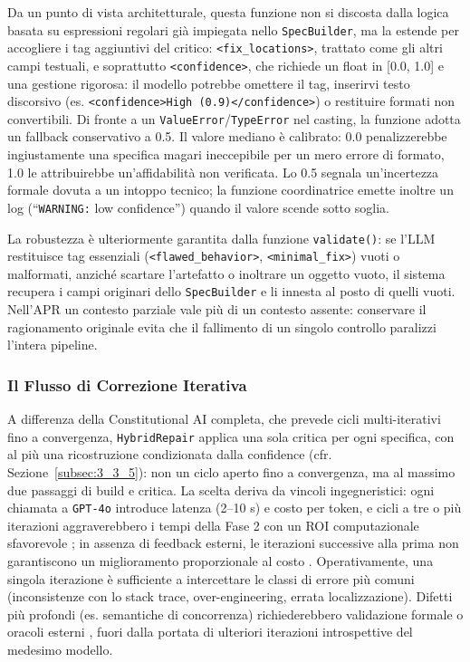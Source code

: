Da un punto di vista architetturale, questa funzione non si discosta dalla logica
basata su espressioni regolari già impiegata nello \texttt{SpecBuilder}, ma la
estende per accogliere i tag aggiuntivi del critico: \texttt{<fix\_locations>}, trattato come gli altri campi
testuali, e soprattutto \texttt{<confidence>}, che richiede un float in [0.0, 1.0] e una gestione rigorosa: il modello
potrebbe omettere il tag, inserirvi testo discorsivo (es. \texttt{<confidence>High (0.9)</confidence>}) o restituire
formati non convertibili. Di fronte a un \texttt{ValueError}/\texttt{TypeError} nel casting, la funzione adotta un
fallback conservativo a 0.5. Il valore mediano è calibrato: 0.0 penalizzerebbe ingiustamente una specifica magari
ineccepibile per un mero errore di formato, 1.0 le attribuirebbe un'affidabilità non verificata. Lo 0.5 segnala
un'incertezza formale dovuta a un intoppo tecnico; la funzione coordinatrice emette inoltre un log
(``\texttt{WARNING:} low confidence'') quando il valore scende sotto soglia.

La robustezza è ulteriormente garantita dalla funzione \texttt{validate()}: se l'LLM restituisce tag essenziali
(\texttt{<flawed\_behavior>}, \texttt{<minimal\_fix>}) vuoti o malformati, anziché scartare l'artefatto o inoltrare
un oggetto vuoto, il sistema recupera i campi originari dello \texttt{SpecBuilder} e li innesta al posto di quelli
vuoti. Nell'APR un contesto parziale vale più di un contesto assente: conservare il ragionamento originale evita
che il fallimento di un singolo controllo paralizzi l'intera pipeline.
\subsubsection{Il Flusso di Correzione Iterativa}
\label{subsubsec:3_3_4_5}
A differenza della Constitutional AI completa, che prevede cicli multi-iterativi fino a convergenza,
\texttt{HybridRepair} applica una sola critica per ogni specifica, con al più una ricostruzione condizionata dalla
confidence (cfr. Sezione~\ref{subsec:3_3_5}): non un ciclo aperto fino a convergenza, ma al massimo due passaggi di
build e critica. La scelta deriva da vincoli ingegneristici:
ogni chiamata a \texttt{GPT-4o} introduce latenza (2--10 s) e costo per token, e cicli a tre o più iterazioni
aggraverebbero i tempi della Fase 2 con un ROI computazionale sfavorevole \cite{chen2023frugalgpt}; in assenza di
feedback esterni, le iterazioni successive alla prima non garantiscono un miglioramento proporzionale al costo
\cite{valmeekam2023can}. Operativamente, una singola iterazione è sufficiente a intercettare le classi di errore
più comuni (inconsistenze con lo stack trace, over-engineering, errata localizzazione). Difetti più profondi (es.
semantiche di concorrenza) richiederebbero validazione formale o oracoli esterni \cite{shinn2023reflexion}, fuori
dalla portata di ulteriori iterazioni introspettive del medesimo modello.

